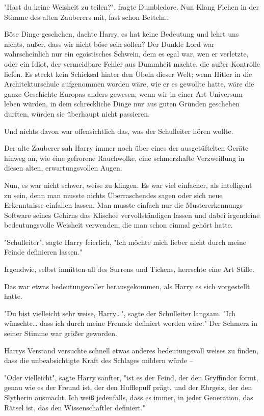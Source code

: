 {"Hast du keine Weisheit zu teilen?", fragte Dumbledore. Nun Klang Flehen in der Stimme des alten Zauberers mit, fast schon Betteln..

Böse Dinge geschehen, dachte Harry, es hat keine Bedeutung und lehrt uns nichts, außer, dass wir nicht böse sein sollen? Der Dunkle Lord war wahrscheinlich nur ein egoistisches Schwein, dem es egal war, wen er verletzte, oder ein Idiot, der vermeidbare Fehler aus Dummheit machte, die außer Kontrolle liefen. Es steckt kein Schicksal hinter den Übeln dieser Welt; wenn Hitler in die Architekturschule aufgenommen worden wäre, wie er es gewollte hatte, wäre die ganze Geschichte Europas anders gewesen; wenn wir in einer Art Universum leben würden, in dem schreckliche Dinge nur aus guten Gründen geschehen durften, würden sie überhaupt nicht passieren.

Und nichts davon war offensichtlich das, was der Schulleiter hören wollte.

Der alte Zauberer sah Harry immer noch über eines der ausgetüftelten Geräte hinweg an, wie eine gefrorene Rauchwolke, eine schmerzhafte Verzweiflung in diesen alten, erwartungsvollen Augen.

Nun, es war nicht schwer, weise zu klingen. Es war viel einfacher, als intelligent zu sein, denn man musste nichts Überraschendes sagen oder sich neue Erkenntnisse einfallen lassen. Man musste einfach nur die Mustererkennungs-Software seines Gehirns das Klischee vervollständigen lassen und dabei irgendeine bedeutungsvolle Weisheit verwenden, die man schon einmal gehört hatte.

"Schulleiter", sagte Harry feierlich, "Ich möchte mich lieber nicht durch meine Feinde definieren lassen."

Irgendwie, selbst inmitten all des Surrens und Tickens, herrschte eine Art Stille.

Das war etwas bedeutungsvoller herausgekommen, als Harry es sich vorgestellt hatte.

"Du bist vielleicht sehr weise, Harry…", sagte der Schulleiter langsam. "Ich wünschte… dass ich durch meine Freunde definiert worden wäre." Der Schmerz in seiner Stimme war größer geworden.

Harrys Verstand versuchte schnell etwas anderes bedeutungsvoll weises zu finden, dass die unbeabsichtigte Kraft des Schlages mildern würde --

"Oder vielleicht", sagte Harry sanfter, "ist es der Feind, der den Gryffindor formt, genau wie es der Freund ist, der den Hufflepuff prägt, und der Ehrgeiz, der den Slytherin ausmacht. Ich weiß jedenfalls, dass es immer, in jeder Generation, das Rätsel ist, das den Wissenschaftler definiert."

}
